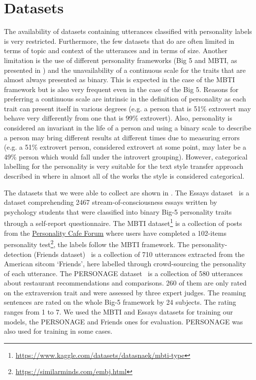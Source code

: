 \documentclass[nomenclature, english, biblatex]{kththesis}
\begin{document}
\section{Datasets}
The availability of datasets containing utterances classified with personality labels is very restricted. Furthermore, the few datasets that do are often limited in terms of topic and context of the utterances and in terms of size. Another limitation is the use of different personality frameworks (Big 5 and \gls{MBTI}, as presented in ) and the unavailability of a continuous scale for the traits that are almost always presented as binary. This is expected in the case of the \gls{MBTI} framework but is also very frequent even in the case of the Big 5. Reasons for preferring a continuous scale are intrinsic in the definition of personality as each trait can present itself in various degrees (e.g. a person that is 51\% extrovert may behave very differently from one that is 99\% extrovert). Also, personality is considered an invariant in the life of a person and using a binary scale to describe a person may bring different results at different times due to measuring errors (e.g. a 51\% extrovert person, considered extrovert at some point, may later be a 49\% person which would fall under the introvert grouping). However, categorical labelling for the personality is very suitable for the text style transfer approach described in  where in almost all of the works the style is considered categorical.

The datasets that we were able to collect are shown in . The Essays dataset~\cite{pennebaker1999linguistic} is a dataset comprehending 2467 stream-of-consciousness essays written by psychology students that were classified into binary Big-5 personality traits through a self-report questionnaire. The MBTI dataset\footnote{\url{https://www.kaggle.com/datasets/datasnaek/mbti-type}} is a collection of posts from the \href{https://www.personalitycafe.com/}{Personality Cafe Forum} where users have completed a 102-items personality test\footnote{\url{https://similarminds.com/embj.html}}, the labels follow the \gls{MBTI} framework. The personality-detection (Friends dataset)~\cite{jiang2020automatic} is a collection of 710 utterances extracted from the American sitcom `Friends', here \textcite{jiang2020automatic} labelled through crowd-sourcing the personality of each utterance. The PERSONAGE dataset~\cite{mairesse2007personage, mairesse2011controlling} is a collection of 580 utterances about restaurant recommendations and comparisons. 260 of them are only rated on the extraversion trait and were assessed by three expert judges. The reaming sentences are rated on the whole Big-5 framework by 24 subjects. The rating ranges from 1 to 7. We used the MBTI and Essays datasets for training our models, the PERSONAGE and Friends ones for evaluation. PERSONAGE was also used for training in some cases.
\end{document}
